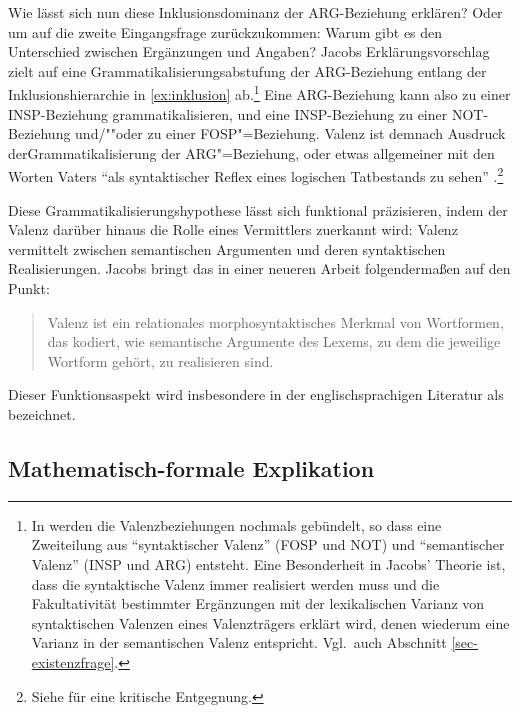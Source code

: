 Wie lässt sich nun diese Inklusionsdominanz der ARG-Beziehung erklären? Oder um auf die zweite Eingangsfrage zurückzukommen: Warum gibt es den Unterschied zwischen Ergänzungen und Angaben? Jacobs Erklärungsvorschlag zielt auf eine Grammatikalisierungsabstufung der ARG-Beziehung entlang der Inklusionshierarchie in \ref{ex:inklusion} ab.\footnote{In \cite{Jacobs:94a} werden die Valenzbeziehungen nochmals gebündelt, so dass eine Zweiteilung aus  "`syntaktischer Valenz"' (FOSP und NOT) und "`semantischer Valenz"' (INSP und ARG) entsteht. Eine Besonderheit in Jacobs' Theorie ist, dass die syntaktische Valenz immer realisiert werden muss und die Fakultativität bestimmter Ergänzungen mit der lexikalischen Varianz von syntaktischen Valenzen eines Valenzträgers erklärt wird, denen wiederum eine Varianz in der semantischen Valenz entspricht. Vgl.\ auch Abschnitt \ref{sec-existenzfrage}.}   
Eine ARG-Beziehung kann also zu einer INSP-Beziehung grammatikalisieren, und eine INSP-Bezie\-hung zu einer NOT-Bezie\-hung und/""oder zu einer FOSP"=Be\-ziehung. Valenz ist demnach Ausdruck der\linebreak Grammatikalisierung der ARG"=Bezie\-hung, oder etwas allgemeiner mit den Worten Vaters "`als syntaktischer Reflex eines logischen Tatbestands zu sehen"' \citep[225]{Vater:81}.\footnote{Siehe \citet[205ff]{Agel:00} für eine kritische Entgegnung.}

\largerpage%
Diese Grammatikalisierungshypothese lässt sich funktional präzisieren, indem der Valenz darüber hinaus die Rolle eines Vermittlers zuerkannt wird: Valenz vermittelt zwischen semantischen Argumenten und deren syntaktischen Realisierungen. Jacobs bringt das in einer neueren Arbeit folgenderma\ss en auf den Punkt: 

\begin{quote}
Valenz ist ein relationales morphosyntaktisches Merkmal von Wortformen, das kodiert, wie semantische Argumente des Lexems, zu dem die jeweilige Wortform gehört, zu realisieren sind. \citep[504]{Jacobs:09}
\end{quote}
Dieser Funktionsaspekt wird insbesondere in der englischsprachigen Literatur als  bezeichnet.



\subsection{Mathematisch-formale Explikation}

